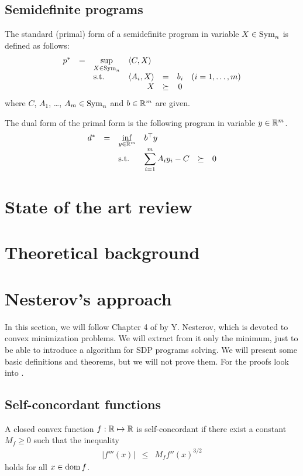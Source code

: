 \subsection{Semidefinite programs}
The standard (primal) form of a semidefinite program in variable $X\in\operatorname{Sym}_n$ is defined as follows:
\begin{eqnarray}
  \begin{array}{rclrrclcll}
    p^* &=& \displaystyle \sup_{X\in\Sym_n} & \multicolumn{3}{l}{\langle C,X\rangle} \\
    && \text{s.t.} & \langle A_i, X\rangle &=& b_i & (i = 1,\ldots,m)\\
    &&& X &\succeq& 0
  \end{array}
\end{eqnarray}
where $C$, $A_1$, \ldots, $A_m \in \operatorname{Sym}_n$ and $b\in\mathbb{R}^m$ are given.

The dual form of the primal form is the following program in variable $y\in\mathbb{R}^m$.
\begin{eqnarray}
  \begin{array}{rclrrclcll}
    d^* &=& \displaystyle \inf_{y\in\R^m} & \multicolumn{3}{l}{b^\top y} \\
    && \text{s.t.} & \displaystyle \sum_{i=1}^m A_iy_i - C &\succeq& 0
  \end{array}
\end{eqnarray}

\section{State of the art review}

\section{Theoretical background}

\section{Nesterov's approach}
In this section, we will follow Chapter 4 of \cite{Nesterov-2004} by Y. Nesterov, which is devoted to convex minimization problems.
We will extract from it only the minimum, just to be able to introduce a algorithm for SDP programs solving.
We will present some basic definitions and theorems, but we will not prove them.
For the proofs look into \cite{Nesterov-2004}.

\subsection{Self-concordant functions}
\begin{definition}
  A closed convex function $f: \mathbb{R} \mapsto \mathbb{R}$ is self-concordant if there exist a constant $M_f \geq 0$ such that the inequality
  \begin{eqnarray}
    |f'''(x)| &\leq& M_f f''(x)^{3/2}
  \end{eqnarray}
  holds for all $x\in\operatorname{dom} f$.
\end{definition}


